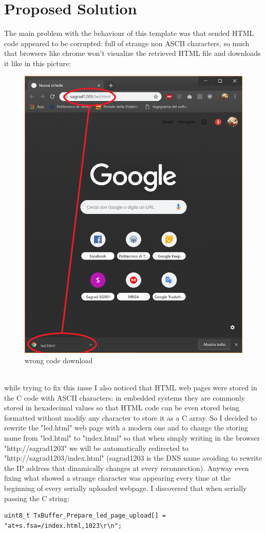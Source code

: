 \documentclass[peerreview]{IEEEtran}
\begin{document}
\section{Proposed Solution}
The main problem with the behaviour of this template was that sended HTML code appeared to be corrupted: full of strange non ASCII characters, so much that browsers like chrome won't visualize the retrieved HTML file and downloads it like in this picture:
\begin{figure}[!h]
\centering
\includegraphics[width=0.5\columnwidth]{7} 
\caption{wrong code download}
\label{fig_download}
\end{figure}
\\while trying to fix this iusse I also noticed that HTML web pages were stored in the C code with ASCII characters: in embedded systems they are commonly stored in hexadecimal values so that HTML code can be even stored being formatted without modify any character to store it as a C array. So I decided to rewrite the "led.html" web page with a modern one and to change the storing name from "led.html" to "index.html" so that when simply writing in the browser "http://sagrad1203" we will be automatically redirected to "http://sagrad1203/index.html" (sagrad1203 is the DNS name avoiding to rewrite the IP address that dinamically changes at every reconnection). Anyway even fixing what showed a strange character was appearing every time at the beginning of every serially uploaded webpage. I discovered that when serially passing the C string:
\begin{lstlisting}[style=CStyle]
uint8_t TxBuffer_Prepare_led_page_upload[] = "at+s.fsa=/index.html,1023\r\n";
\end{lstlisting}
\end{document}
